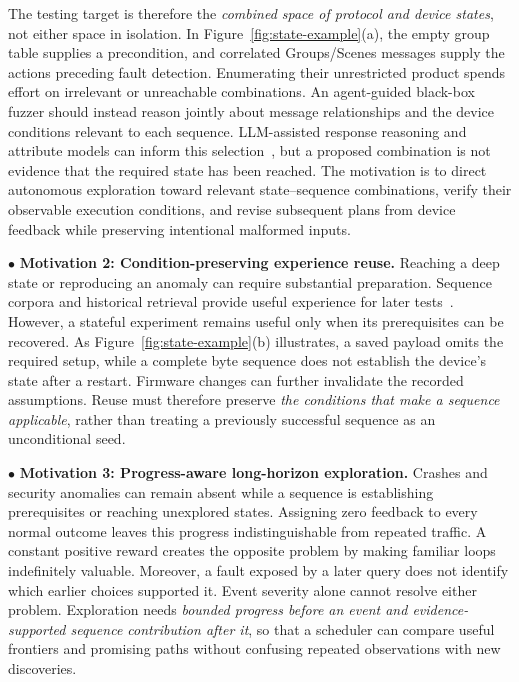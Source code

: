 \documentclass[10pt,journal,compsoc]{IEEEtran}
\begin{document}
The testing target is therefore the \emph{combined space of protocol and device states}, not either space in isolation. In Figure~\ref{fig:state-example}(a), the empty group table supplies a precondition, and correlated Groups/Scenes messages supply the actions preceding fault detection. Enumerating their unrestricted product spends effort on irrelevant or unreachable combinations. An agent-guided black-box fuzzer should instead reason jointly about message relationships and the device conditions relevant to each sequence. LLM-assisted response reasoning and attribute models can inform this selection~\cite{llmif,mgptfuzz}, but a proposed combination is not evidence that the required state has been reached. The motivation is to direct autonomous exploration toward relevant state--sequence combinations, verify their observable execution conditions, and revise subsequent plans from device feedback while preserving intentional malformed inputs.

\noindent $\bullet$ \textbf{Motivation 2: Condition-preserving experience reuse.}\label{sec:motivation2}
Reaching a deep state or reproducing an anomaly can require substantial preparation. Sequence corpora and historical retrieval provide useful experience for later tests~\cite{llmif,malf}. However, a stateful experiment remains useful only when its prerequisites can be recovered. As Figure~\ref{fig:state-example}(b) illustrates, a saved payload omits the required setup, while a complete byte sequence does not establish the device's state after a restart. Firmware changes can further invalidate the recorded assumptions. Reuse must therefore preserve \emph{the conditions that make a sequence applicable}, rather than treating a previously successful sequence as an unconditional seed.

\noindent $\bullet$ \textbf{Motivation 3: Progress-aware long-horizon exploration.}\label{sec:motivation3}
Crashes and security anomalies can remain absent while a sequence is establishing prerequisites or reaching unexplored states. Assigning zero feedback to every normal outcome leaves this progress indistinguishable from repeated traffic. A constant positive reward creates the opposite problem by making familiar loops indefinitely valuable. Moreover, a fault exposed by a later query does not identify which earlier choices supported it. Event severity alone cannot resolve either problem. Exploration needs \emph{bounded progress before an event and evidence-supported sequence contribution after it}, so that a scheduler can compare useful frontiers and promising paths without confusing repeated observations with new discoveries.
\end{document}
